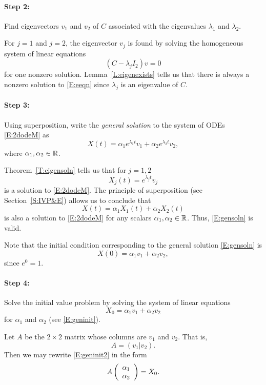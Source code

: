 \documentclass{ximera}
\begin{document}
\paragraph{Step 2:}  Find eigenvectors $v_1$ and $v_2$ of $C$ associated
with the eigenvalues $\lambda_1$ and $\lambda_2$.

For $j=1$ and $j=2$, the eigenvector $v_j$ is found by solving the
homogeneous system of linear equations
\begin{equation}  \label{E:eeqn}
(C-\lambda_j I_2)v = 0
\end{equation}
for one nonzero solution.  Lemma~\ref{L:eigenexists} tells us that there is
always a nonzero solution to \eqref{E:eeqn} since $\lambda_j$ is an eigenvalue
of $C$.

\paragraph{Step 3:}  Using superposition, write the {\em general solution\/}
 to the system of ODEs \eqref{E:2dodeM} as
\begin{equation}  \label{E:gensoln}
X(t) = \alpha_1e^{\lambda_1 t}v_1 + \alpha_2 e^{\lambda_2 t}v_2,
\end{equation}
where $\alpha_1,\alpha_2\in\mbox{$\Bbb{R}$}$.

Theorem~\ref{T:eigensoln} tells us that for $j=1,2$
\[
X_j(t) = e^{\lambda_j t}v_j
\]
is a solution to \eqref{E:2dodeM}.  The principle of superposition (see
Section~\ref{S:IVP&E}) allows us to conclude that
\[
X(t) = \alpha_1X_1(t) + \alpha_2X_2(t)
\]
is also a solution to \eqref{E:2dodeM} for any scalars $\alpha_1,\alpha_2\in\mbox{$\Bbb{R}$}$.
Thus, \eqref{E:gensoln} is valid.

Note that the initial condition corresponding to the general solution
\eqref{E:gensoln} is
\begin{equation} \label{E:geninit}
X(0) = \alpha_1v_1 + \alpha_2v_2,
\end{equation}
since $e^0=1$.

\paragraph{Step 4:}  Solve the initial value problem by solving the system
of linear equations
\begin{equation} \label{E:geninit2}
X_0 = \alpha_1v_1 + \alpha_2v_2
\end{equation}
for $\alpha_1 $ and $\alpha_2$ (see \eqref{E:geninit}).

Let $A$ be the $2\times 2$ matrix whose columns are $v_1$ and $v_2$.  That
is,
\begin{equation} \label{E:Av1v2}
A = (v_1|v_2).
\end{equation}
Then we may rewrite \eqref{E:geninit2} in the form
\begin{equation} \label{E:solveinit}
A\left(\begin{array}{r} \alpha_1 \\ \alpha_2\end{array}\right) = X_0.
\end{equation}
\end{document}
